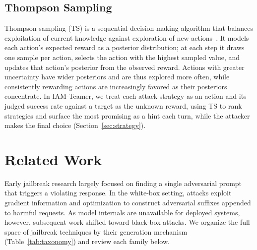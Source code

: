 \documentclass[a4paper,fleqn]{cas-sc}
\begin{document}
\subsection{Thompson Sampling}

Thompson sampling (TS) is a sequential decision-making algorithm that balances exploitation of current knowledge against exploration of new actions~\cite{thompson}.
It models each action's expected reward as a posterior distribution; at each step it draws one sample per action, selects the action with the highest sampled value, and updates that action's posterior from the observed reward.
Actions with greater uncertainty have wider posteriors and are thus explored more often, while consistently rewarding actions are increasingly favored as their posteriors concentrate.
In IAM-Teamer, we treat each attack strategy as an action and its judged success rate against a target as the unknown reward, using TS to rank strategies and surface the most promising as a hint each turn, while the attacker makes the final choice (Section~\ref{sec:strategy}).
\section{Related Work}
\label{sec:related}

Early jailbreak research largely focused on finding a single adversarial prompt that triggers a violating response.
In the white-box setting, attacks exploit gradient information and optimization to construct adversarial suffixes appended to harmful requests.
As model internals are unavailable for deployed systems, however, subsequent work shifted toward black-box attacks.
We organize the full space of jailbreak techniques by their generation mechanism (Table~\ref{tab:taxonomy}) and review each family below.
\end{document}
